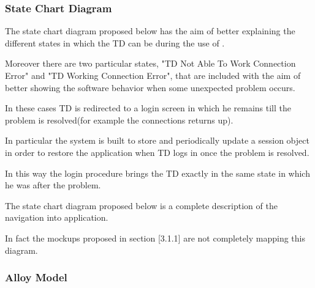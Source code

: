 \subsubsection{State Chart Diagram}
\begin{itemize}
\par The state chart diagram proposed below has the aim of better explaining the different states in which the TD can be during the use of \myTaxiService{}. \par
Moreover there are two particular states, "TD Not Able To Work Connection Error" and "TD Working Connection Error", that are included with the aim of better showing the software behavior when some unexpected problem occurs. \par
In these cases TD is redirected to a login screen in which he remains till the problem is resolved(for example the connections returns up).\par 
In particular the system is built to store and periodically update a session object in order to restore the application when TD logs in once the problem is resolved. \par 
In this way the login procedure  brings the TD exactly in the same state in which he was after the problem.
\par The state chart diagram proposed below is a complete description of the navigation into \myTaxiService{} application. \par In fact the mockups proposed in section [3.1.1] are not completely mapping this diagram.
\end{itemize}
\newpage
\subsubsection{Alloy Model}
\begin{itemize}
	\newpage
	\newpage
	\newpage
	\newpage
	\newpage
	\newpage
\end{itemize}
